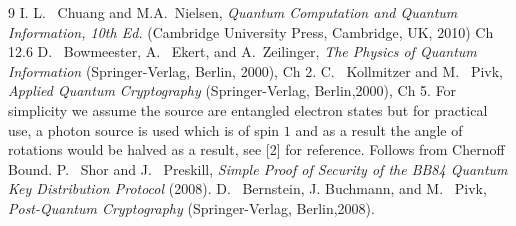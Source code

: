\documentclass[aps,prd,final,twocolumn,letterpaper]{revtex4}
\begin{document}
\begin{thebibliography} {9}
 I. L. ~Chuang and M.A.~Nielsen, {\sl Quantum Computation and Quantum Information, 10th Ed.} (Cambridge University Press, Cambridge, UK, 2010) Ch 12.6
D. ~Bowmeester, A. ~Ekert, and A.~Zeilinger, {
\sl The Physics of Quantum Information\/} (Springer-Verlag, Berlin, 2000), Ch 2.
 C. ~Kollmitzer and M. ~Pivk,   {
\sl Applied Quantum Cryptography\/} (Springer-Verlag, Berlin,2000), Ch 5.
 For simplicity we assume the source are entangled electron states but for practical use, a photon source is used which is of spin $1$ and as a result the angle of rotations would be halved as a result, see [2] for reference.
 Follows from Chernoff Bound.
 P. ~Shor and J. ~Preskill,   {
\sl Simple Proof of Security of the BB84 Quantum Key Distribution Protocol\/} (2008).
 D. ~Bernstein, J. Buchmann, and M. ~Pivk,   {
\sl Post-Quantum Cryptography\/} (Springer-Verlag, Berlin,2008).
\end{thebibliography}
\end{document}
